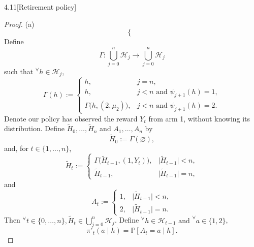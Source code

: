 \documentclass[10pt]{article}
\theoremstyle{definition}
\newenvironment{exercise*}[1]{%
  \IfBlankTF{#1}
    {\renewcommand{\themanualexerciseinner}{\unskip}}
    {\renewcommand\themanualexerciseinner{#1}}%
  \manualexerciseinner
}{\endmanualexerciseinner}
\begin{document}
\begin{exercise*}{4.11}[Retirement policy]
\begin{proof}{(a)}
\begin{equation*}
\begin{cases}
            \end{cases} 
        \end{equation*}
        Define 
        \begin{equation*}
            \Gamma:\bigcup_{j=0}^n\mathcal H_j \longrightarrow \bigcup_{j=0}^n\mathcal H_j 
        \end{equation*}
        such that
        $^\forall h\in\mathcal H_j$,
        \begin{equation*}
            \Gamma(h):= 
            \begin{cases} 
                h, & j=n,\\ 
                h, & j<n \text{ and } \psi_{j+1}(h)=1,
                \\ \Gamma\bigl(h,(2,\mu_2)\bigr), & j<n \text{ and } \psi_{j+1}(h)=2.
            \end{cases} 
        \end{equation*}
        Denote our policy has observed the reward $Y_t$ from arm 1, without knowing its distribution.
        Define $\widetilde H_0,\ldots,\widetilde H_n$ and $A_1,\ldots,A_n$ by 
        \begin{equation*}
            \widetilde H_0:=\Gamma(\varnothing), 
        \end{equation*}
        and, for $t\in\{1,\ldots,n\}$, 
        \begin{equation*}
            \widetilde H_t:= 
            \begin{cases} 
                \Gamma\bigl(\widetilde H_{t-1},(1,Y_t)\bigr), & \lvert\widetilde H_{t-1}\rvert<n,\\ 
                \widetilde H_{t-1}, & \lvert\widetilde H_{t-1}\rvert=n,
            \end{cases} 
        \end{equation*}
        and 
        \begin{equation*}
            A_t:= 
            \begin{cases} 
                1, & \lvert\widetilde H_{t-1}\rvert<n,\\ 
                2, & \lvert\widetilde H_{t-1}\rvert=n.
            \end{cases} 
        \end{equation*}
        Then $^\forall t \in \{0, \ldots, n \}, \widetilde{H}_t \in \bigcup_{j=0}^n\mathcal H_j$.
        Define $^\forall h \in \mathcal{H}_{t-1} \text{ and } ^\forall a \in \{1,2\}$,
        \begin{equation*}
            \pi'_t(a\mid h) = \mathbb P[A_t=a\mid h].

\end{equation*}
\end{proof}
\end{exercise*}
\end{document}
